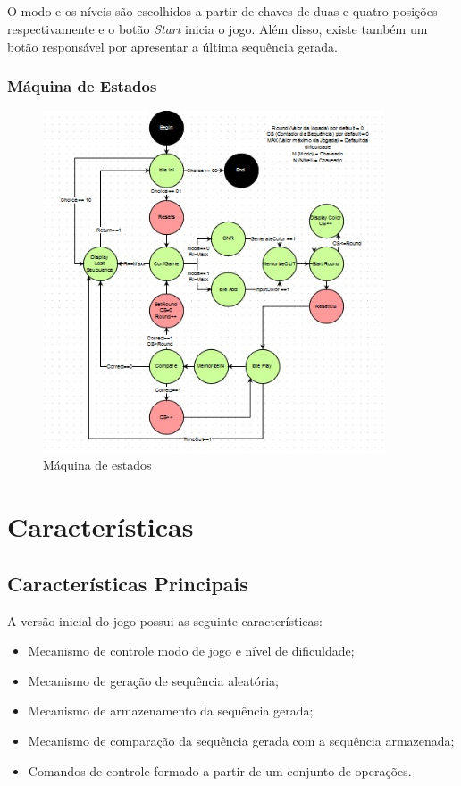 \documentclass{report}
\begin{document}
 \paragraph{}
   O modo e os níveis são escolhidos a partir de chaves de duas e quatro posições respectivamente e o botão \textit{Start} inicia o jogo. Além disso, existe também um botão responsável por apresentar a última sequência gerada.
 
    \subsection{Máquina de Estados}
    \begin{figure}[H] \centering \includegraphics[width=0.9\textwidth]{Figura2.jpg}                \caption{Máquina de estados} \label{fig:mesh1} 
    \end{figure}
     
    
\chapter{Características}
    \section{Características Principais}
    A versão inicial do jogo possui as seguinte características:
     \begin{itemize}
        \item Mecanismo de controle modo de jogo e nível de dificuldade;
        \item Mecanismo de geração de sequência aleatória;
        \item Mecanismo de armazenamento da sequência gerada;
        \item Mecanismo de comparação da sequência gerada com a sequência armazenada;
        \item Comandos de controle formado a partir de um conjunto de operações.
      \end{itemize}
    
\end{document}
